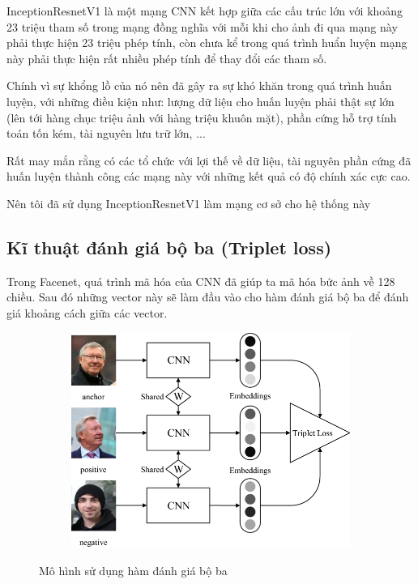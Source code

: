 InceptionResnetV1 là một mạng CNN kết hợp giữa các cấu trúc lớn với khoảng 23 triệu tham số trong mạng đồng nghĩa với
mỗi khi cho ảnh đi qua mạng này phải thực hiện 23 triệu phép tính, còn chưa kể trong quá trình huẩn luyện
mạng này phải thực hiện rất nhiều phép tính để thay đổi các tham số.

Chính vì sự khổng lồ của nó nên đã gây ra sự khó khăn trong quá trình huấn luyện, với những điều kiện như:
lượng dữ liệu cho huấn luyện phải thật sự lớn (lên tới hàng chục triệu ảnh với hàng triệu khuôn mặt),
phần cứng hỗ trợ tính toán tốn kém, tài nguyên lưu trữ lớn, ...

Rất may mắn rằng có các tổ chức với lợi thế về dữ liệu, tài nguyên phần cứng đã huấn luyện thành công
các mạng này với những kết quả có độ chính xác cực cao.

Nên tôi đã sử dụng InceptionResnetV1 làm mạng cơ sở cho hệ thống này

\newpage
\subsection{Kĩ thuật đánh giá bộ ba (Triplet loss)}
Trong Facenet, quá trình mã hóa của CNN đã giúp ta mã hóa bức ảnh về 128 chiều.
Sau đó những vector này sẽ làm đầu vào cho hàm đánh giá bộ ba để đánh giá khoảng
cách giữa các vector.

\begin{figure}
    \begin{subfigure}{1.\textwidth}
        \begin{center}
            \includegraphics[width=1.\linewidth]{Chapters/items/chap2_18.jpg}
        \end{center}
        \label{fig: chap2_18}
    \end{subfigure}
    \caption{Mô hình sử dụng hàm đánh giá bộ ba}
\end{figure}

